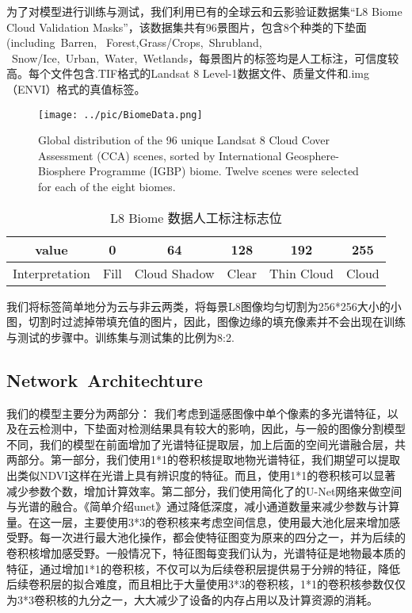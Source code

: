 \documentclass[UTF8]{ctexart}
\begin{document}
为了对模型进行训练与测试，我们利用已有的全球云和云影验证数据集“L8 Biome Cloud Validation Masks”\cite{foga2017cloud_data}，该数据集共有96景图片，包含8个种类的下垫面(including Barren, 
Forest,Grass/Crops, Shrubland,
 Snow/Ice, Urban, Water, Wetlands，每景图片的标签均是人工标注，可信度较高。每个文件包含.TIF格式的Landsat 8 Level-1数据文件、质量文件和.img（ENVI）格式的真值标签。

\begin{figure}[ht]
    \centering
    \texttt{[image: ../pic/BiomeData.png]}
    \caption{Global distribution of the 96 unique Landsat 8 Cloud Cover Assessment (CCA) scenes, sorted by International Geosphere-Biosphere Programme (IGBP) biome. Twelve scenes were selected for each of the eight biomes.}
    \label{fig:label}
    \end{figure}

\begin{table}[ht]
    \centering
    \begin{tabular}{c|ccccc}
    \hline
    \hline
    value& 0& 64& 128& 192& 255\\
    \hline
    Interpretation&	Fill& Cloud Shadow& Clear &Thin Cloud& Cloud\\
    \hline
    \hline
    \end{tabular}
    \caption{L8 Biome 数据人工标注标志位}
    \end{table}

我们将标签简单地分为云与非云两类，将每景L8图像均匀切割为256*256大小的小图，切割时过滤掉带填充值的图片，因此，图像边缘的填充像素并不会出现在训练与测试的步骤中。训练集与测试集的比例为8:2.

\subsection{Network Architechture}

我们的模型主要分为两部分：
我们考虑到遥感图像中单个像素的多光谱特征，以及在云检测中，下垫面对检测结果具有较大的影响，因此，与一般的图像分割模型不同，我们的模型在前面增加了光谱特征提取层，加上后面的空间光谱融合层，共两部分。第一部分，我们使用1*1的卷积核提取地物光谱特征，我们期望可以提取出类似NDVI这样在光谱上具有辨识度的特征。而且，使用1*1的卷积核可以显著减少参数个数，增加计算效率。第二部分，我们使用简化了的U-Net网络来做空间与光谱的融合。《简单介绍unet》通过降低深度，减小通道数量来减少参数与计算量。在这一层，主要使用3*3的卷积核来考虑空间信息，使用最大池化层来增加感受野。每一次进行最大池化操作，都会使特征图变为原来的四分之一，并为后续的卷积核增加感受野。一般情况下，特征图每变我们认为，光谱特征是地物最本质的特征，通过增加1*1的卷积核，不仅可以为后续卷积层提供易于分辨的特征，降低后续卷积层的拟合难度，而且相比于大量使用3*3的卷积核，1*1的卷积核参数仅仅为3*3卷积核的九分之一，大大减少了设备的内存占用以及计算资源的消耗。
\end{document}
